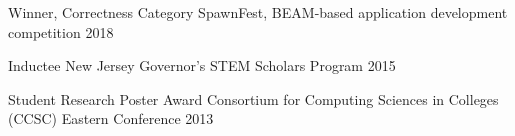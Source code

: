 
\begin{cvhonors}

  \cvhonor
    {Winner, Correctness Category} %
    {SpawnFest, BEAM-based application development competition} %
    {2018} %

  \cvhonor
    {Inductee} %
    {New Jersey Governor's STEM Scholars Program} %
    {2015} %

  \cvhonor
    {Student Research Poster Award} %
    {Consortium for Computing Sciences in Colleges (CCSC) Eastern Conference} %
    {2013} %

\end{cvhonors}
